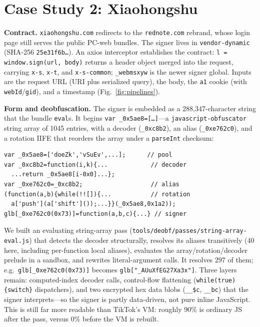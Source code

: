 \documentclass[conference,10pt]{IEEEtran}
\newcommand{\code}[1]{\texttt{\small #1}}
\begin{document}
\section{Case Study 2: Xiaohongshu}
\label{sec:xhs}
\textbf{Contract.} \code{xiaohongshu.com} redirects to the \code{rednote.com} rebrand, whose login page still serves the public PC-web bundles. The signer lives in \code{vendor-dynamic} (SHA-256 \code{25e31f6b{\ldots}}). An axios interceptor establishes the contract: \code{l = window.sign(url, body)} returns a header object merged into the request, carrying \code{x-s}, \code{x-t}, and \code{x-s-common}; \code{\_webmsxyw} is the newer signer global. Inputs are the request URL (URI plus serialized query), the body, the \code{a1} cookie (with \code{webId}/\code{gid}), and a timestamp (Fig.~\ref{fig:pipelines}).

\textbf{Form and deobfuscation.} The signer is embedded as a 288{,}347-character string that the bundle \code{eval}s. It begins \code{var \_0x5ae8=[\ldots]}---a \code{javascript-obfuscator} string array of 1045 entries, with a decoder (\code{\_0xc8b2}), an alias (\code{\_0xe762c0}), and a rotation IIFE that reorders the array under a \code{parseInt} checksum:
\begin{lstlisting}
var _0x5ae8=['doeZk','vSuEv',...];      // pool
var _0xc8b2=function(i,k){...            // decoder
  ...return _0x5ae8[i-0x0]...};
var _0xe762c0=_0xc8b2;                   // alias
(function(a,b){while(!![]){...           // rotation
  a['push'](a['shift']());...}}(_0x5ae8,0x1a2));
glb[_0xe762c0(0x73)]=function(a,b,c){...} // signer
\end{lstlisting}
We built an evaluating string-array pass (\code{tools/deobf/passes/string-array-eval.js}) that detects the decoder structurally, resolves its aliases transitively (40 here, including per-function local aliases), evaluates the array/rotation/decoder prelude in a sandbox, and rewrites literal-argument calls. It resolves 297 of them; e.g.\ \code{glb[\_0xe762c0(0x73)]} becomes \code{glb["\_AUuXfEG27Xa3x"]}. Three layers remain: computed-index decoder calls, control-flow flattening (\code{while(true)\{switch\}} dispatchers), and two encrypted hex data blobs (\code{\_\_\$c}, \code{\_\_bc}) that the signer interprets---so the signer is partly data-driven, not pure inline JavaScript. This is still far more readable than TikTok's VM: roughly 90\% is ordinary JS after the pass, versus 0\% before the VM is rebuilt.
\end{document}
